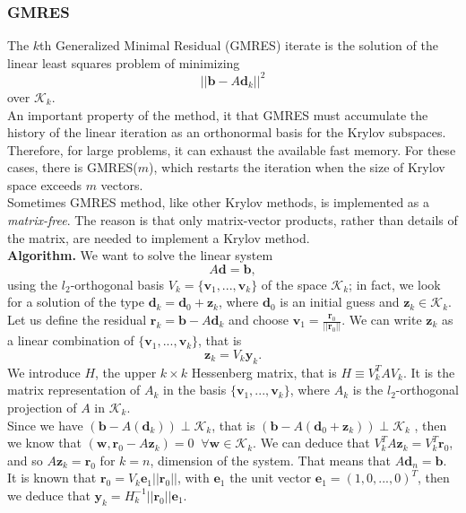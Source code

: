  \subsubsection{GMRES} 
 The $k$th Generalized Minimal Residual (GMRES) iterate is the solution of the linear least squares problem of minimizing 
 \begin{equation*}
 ||\textbf{b}-A\textbf{d}_k ||^2
 \end{equation*}
 over $\mathcal{K}_k$.\\
 An important property of the method, it that GMRES must accumulate the history of the linear iteration as an orthonormal basis for the Krylov subspaces. Therefore, for large problems, it can exhaust the available fast memory. For these cases, there is GMRES($m$), which restarts the iteration when the size of Krylov space exceeds $m$ vectors. \\
 Sometimes GMRES method, like other Krylov methods, is implemented as a \textit{matrix-free}. The reason is that only matrix-vector products, rather than details of the matrix, are needed to implement a Krylov method.\\
\noindent \textbf{Algorithm.} We want to solve the linear system 
\begin{equation*}
A \textbf{d}= \textbf{b},
\end{equation*}
using the $l_2$-orthogonal basis $V_k = \{\textbf{v}_1, ...,\textbf{v}_k \}$ of the space $\mathcal{K}_k$; in fact, we look for a solution of the type $\textbf{d}_k = \textbf{d}_0 + \textbf{z}_k$, where $\textbf{d}_0$ is an initial guess and $\textbf{z}_k \in \mathcal{K}_k$. Let us define the residual $\textbf{r}_k = \textbf{b}-A\textbf{d}_k$ and choose $\textbf{v}_1 = \frac{\textbf{r}_0}{||\textbf{r}_0||}$. We can write $\textbf{z}_k$ as a linear combination of $\{\textbf{v}_1, ...,\textbf{v}_k \}$, that is 
\begin{equation*}
\textbf{z}_k = V_k \textbf{y}_k .
\end{equation*}
We introduce $H$, the upper $k \times k$ Hessenberg matrix, that is $H \equiv V_k^T A V_k$. It is the matrix representation of $A_k$ in the basis $\{\textbf{v}_1, ...,\textbf{v}_k \}$, where $ A_k $ is the $ l_2 $-orthogonal projection of $ A $ in $ \mathcal{K}_k $. \\
Since we have $(\textbf{b} - A(\textbf{d}_k)) \perp \mathcal{K}_k$, that is $(\textbf{b} - A(\textbf{d}_0 + \textbf{z}\textbf{}_k)) \perp \mathcal{K}_k$ , then we know that $(\textbf{w},\textbf{r}_0 - A \textbf{z}_k) = 0 \; \; \forall \textbf{w} \in \mathcal{K}_k$. We can deduce that $V_k^T A \textbf{z}_k = V_k^T \textbf{r}_0$, and so $A \textbf{z}_k = \textbf{r}_0$ for $ k = n $, dimension of the system. That means that $ A \textbf{d}_n = \textbf{b} $. \\
 It is known that $\textbf{r}_0 =V_k \textbf{e}_1 ||\textbf{r}_0||$, with $\textbf{e}_1$ the unit vector $\textbf{e}_1 = (1, 0, ..., 0)^T$, then we deduce that $\textbf{y}_k = H_k^{-1} ||\textbf{r}_0||\textbf{e}_1$. 
\\

